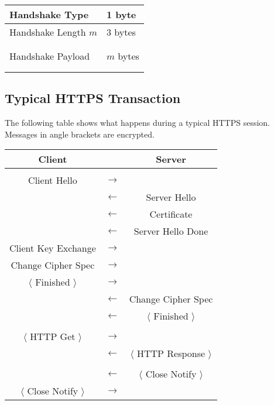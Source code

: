 \documentclass[11pt]{article}
\begin{document}
\begin{center}
\begin{tabular}{|ll|}
\hline
Handshake Type & 1 byte\\
\hline
Handshake Length $m$ & 3 bytes\\
\hline
&\\
&\\
Handshake Payload & $m$ bytes\\
&\\
&\\
\hline
\end{tabular}
\end{center}

\subsection*{Typical HTTPS Transaction}
The following table shows what happens during a
typical HTTPS session.
Messages in angle brackets are encrypted.

\begin{center}
\begin{tabular}{|ccc|}
\hline
Client & & Server\\
\hline
& & \\
Client Hello & $\longrightarrow$ &\\
& $\longleftarrow$ & Server Hello\\
& $\longleftarrow$ & Certificate\\
& $\longleftarrow$ & Server Hello Done\\
Client Key Exchange & $\longrightarrow$ &\\
Change Cipher Spec & $\longrightarrow$ &\\
$\langle$ Finished $\rangle$ & $\longrightarrow$ &\\
& $\longleftarrow$ & Change Cipher Spec\\
& $\longleftarrow$ & $\langle$ Finished $\rangle$\\
& &\\
$\langle$ HTTP Get $\rangle$ & $\longrightarrow$ & \\
& $\longleftarrow$ & $\langle$ HTTP Response $\rangle$\\
& & \\
& $\longleftarrow$ & $\langle$ Close Notify $\rangle$\\
$\langle$ Close Notify $\rangle$ & $\longrightarrow$ &\\
\hline
\end{tabular}
\end{center}
\end{document}
